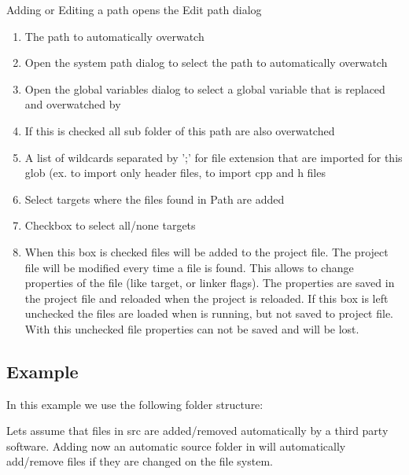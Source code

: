 Adding or Editing a path opens the Edit path dialog


\begin{enumerate}[noitemsep]
\item The path to automatically overwatch
\item Open the system path dialog to select the path to automatically overwatch
\item Open the global variables dialog to select a global variable that is replaced and overwatched by \codeblocks
\item If this is checked all sub folder of this path are also overwatched
\item A list of wildcards separated by ';' for file extension that are imported for this glob (ex.  to import only header files,  to import cpp and h files
\item Select targets where the files found in Path are added
\item Checkbox to select all/none targets
\item When this box is checked files will be added to the project file. 
    The project file will be modified every time a file is found. This 
    allows to change properties of the file (like target, or linker flags). 
    The properties are saved in the project file and reloaded when the 
    project is reloaded. If this box is left unchecked the files are loaded 
    when \codeblocks is running, but not saved to project file. With this 
    unchecked file properties can not be saved and will be lost.
\end{enumerate}

\subsection{Example}
In this example we use the following folder structure:

Lets assume that files in src are added/removed automatically by a third party software. Adding now an automatic source folder in \codeblocks will automatically add/remove files if they are changed on the file system.

